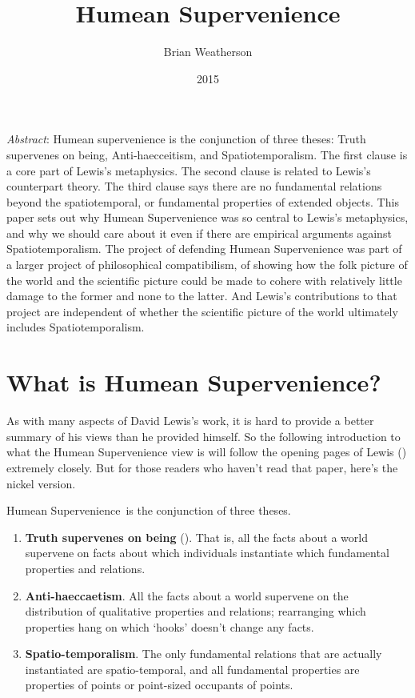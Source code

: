 \documentclass[
  11pt,
  letterpaper,
  DIV=11,
  numbers=noendperiod,
  twoside]{scrartcl}
\title{Humean Supervenience}
\author{Brian Weatherson}
\date{2015}
\providecommand{\tightlist}{%
  \setlength{\itemsep}{0pt}\setlength{\parskip}{0pt}}
\renewenvironment{abstract}
 {\vspace{-1.25cm}
 \quotation\small\noindent\emph{Abstract}:}
 {\endquotation}
\begin{document}
\maketitle
\begin{abstract}
Humean supervenience is the conjunction of three theses: Truth
supervenes on being, Anti‐haecceitism, and Spatiotemporalism. The first
clause is a core part of Lewis's metaphysics. The second clause is
related to Lewis's counterpart theory. The third clause says there are
no fundamental relations beyond the spatiotemporal, or fundamental
properties of extended objects. This paper sets out why Humean
Supervenience was so central to Lewis's metaphysics, and why we should
care about it even if there are empirical arguments against
Spatiotemporalism. The project of defending Humean Supervenience was
part of a larger project of philosophical compatibilism, of showing how
the folk picture of the world and the scientific picture could be made
to cohere with relatively little damage to the former and none to the
latter. And Lewis's contributions to that project are independent of
whether the scientific picture of the world ultimately includes
Spatiotemporalism.
\end{abstract}


\section{What is Humean
Supervenience?}\label{what-is-humean-supervenience}

As with many aspects of David Lewis's work, it is hard to provide a
better summary of his views than he provided himself. So the following
introduction to what the Humean Supervenience view is will follow the
opening pages of Lewis () extremely
closely. But for those readers who haven't read that paper, here's the
nickel version.

Humean Supervenience~is the conjunction of three theses.

\begin{enumerate}
\def\labelenumi{\arabic{enumi}.}
\tightlist
\item
  \textbf{Truth supervenes on being} (). That is, all the facts about a world supervene on facts about
  which individuals instantiate which fundamental properties and
  relations.
\item
  \textbf{Anti-haeccaetism}. All the facts about a world supervene on
  the distribution of qualitative properties and relations; rearranging
  which properties hang on which `hooks' doesn't change any facts.
\item
  \textbf{Spatio-temporalism}. The only fundamental relations that are
  actually instantiated are spatio-temporal, and all fundamental
  properties are properties of points or point-sized occupants of
  points.
\end{enumerate}
\end{document}
